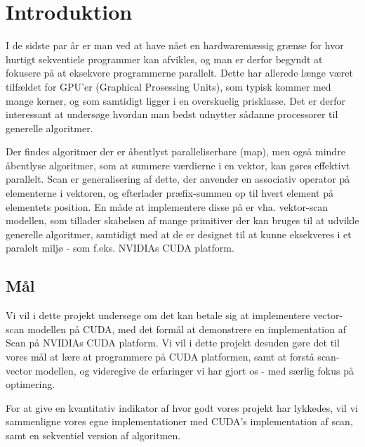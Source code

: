 

\section{Introduktion}
I de sidste par år er man ved at have nået en hardwaremæssig grænse for hvor
hurtigt sekventiele programmer kan afvikles, og man er derfor begyndt at fokusere på at eksekvere programmerne
parallelt. Dette har allerede længe været tilfældet for GPU'er (Graphical Prosessing Units), som typisk kommer med mange kerner, og som samtidigt ligger i en overskuelig prisklasse. Det er derfor interessant 
at undersøge hvordan man bedst udnytter sådanne processorer til generelle algoritmer. 

Der findes algoritmer der er åbentlyst paralleliserbare (map), men også mindre åbentlyse algoritmer, som at 
summere værdierne i en vektor, kan gøres effektivt parallelt. Scan er generalisering af dette, der anvender en associativ operator på elementerne i vektoren, og efterlader præfix-summen op til hvert element på elementets position. En måde at implementere disse på er vha. vektor-scan modellen, som tillader skabelsen af mange primitiver der kan bruges til at udvikle generelle algoritmer, samtidigt med at de er designet til at kunne eksekveres i et paralelt miljø - som f.eks. NVIDIAs CUDA platform.

\subsection{Mål}

Vi vil i dette projekt undersøge om det kan betale sig at implementere vector-scan modellen på CUDA, med det formål at demonstrere en implementation af Scan på NVIDIAs CUDA platform. Vi vil i dette projekt desuden gøre det til vores mål at lære at programmere på CUDA platformen, samt at forstå scan-vector modellen, og videregive de erfaringer vi har gjort os - med særlig fokus på optimering.

For at give en kvantitativ indikator af hvor godt vores projekt har lykkedes, vil vi sammenligne vores egne implementationer med CUDA's implementation af scan, samt en sekventiel version af algoritmen.\\
